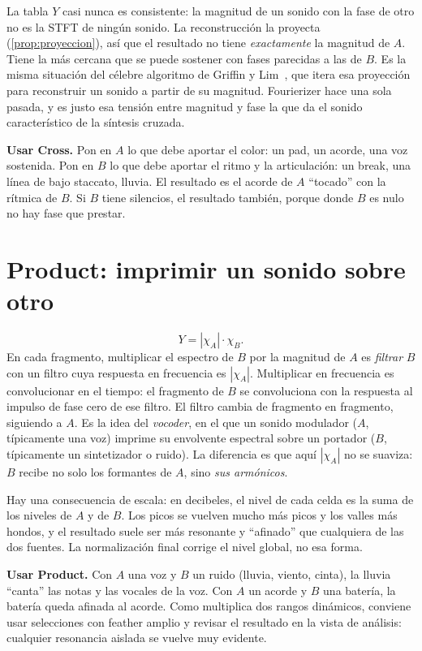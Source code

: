 La tabla $Y$ casi nunca es consistente: la magnitud de un sonido con la fase de otro no es la STFT de
ningún sonido. La reconstrucción la proyecta (\cref{prop:proyeccion}), así que el resultado no tiene
\emph{exactamente} la magnitud de $A$. Tiene la más cercana que se puede sostener con fases parecidas a
las de $B$. Es la misma situación del célebre algoritmo de Griffin y Lim~\cite{griffinlim1984}, que
itera esa proyección para reconstruir un sonido a partir de su magnitud. Fourierizer hace una sola
pasada, y es justo esa tensión entre magnitud y fase la que da el sonido característico de la síntesis
cruzada.

\begin{estudio}
\textbf{Usar Cross.} Pon en $A$ lo que debe aportar el color: un pad, un acorde, una voz sostenida.
Pon en $B$ lo que debe aportar el ritmo y la articulación: un break, una línea de bajo staccato,
lluvia. El resultado es el acorde de $A$ ``tocado'' con la rítmica de $B$. Si $B$ tiene silencios, el
resultado también, porque donde $B$ es nulo no hay fase que prestar.
\end{estudio}

\section{Product: imprimir un sonido sobre otro}

\[
  Y=|\chi_A|\cdot\chi_B .
\]
En cada fragmento, multiplicar el espectro de $B$ por la magnitud de $A$ es \emph{filtrar} $B$ con un
filtro cuya respuesta en frecuencia es $|\chi_A|$. Multiplicar en frecuencia es convolucionar en el
tiempo: el fragmento de $B$ se convoluciona con la respuesta al impulso de fase cero de ese filtro.
El filtro cambia de fragmento en fragmento, siguiendo a $A$. Es la idea del \emph{vocoder}, en el
que un sonido modulador ($A$, típicamente una voz) imprime su envolvente espectral sobre un portador
($B$, típicamente un sintetizador o ruido). La diferencia es que aquí $|\chi_A|$ no se suaviza: $B$
recibe no solo los formantes de $A$, sino \emph{sus armónicos}.

Hay una consecuencia de escala: en decibeles, el nivel de cada celda es la suma de los niveles de
$A$ y de $B$. Los picos se vuelven mucho más picos y los valles más hondos, y el resultado suele ser
más resonante y ``afinado'' que cualquiera de las dos fuentes. La normalización final corrige el
nivel global, no esa forma.

\begin{estudio}
\textbf{Usar Product.} Con $A$ una voz y $B$ un ruido (lluvia, viento, cinta), la lluvia ``canta''
las notas y las vocales de la voz. Con $A$ un acorde y $B$ una batería, la batería queda afinada al
acorde. Como multiplica dos rangos dinámicos, conviene usar selecciones con feather amplio y
revisar el resultado en la vista de análisis: cualquier resonancia aislada se vuelve muy
evidente.
\end{estudio}

